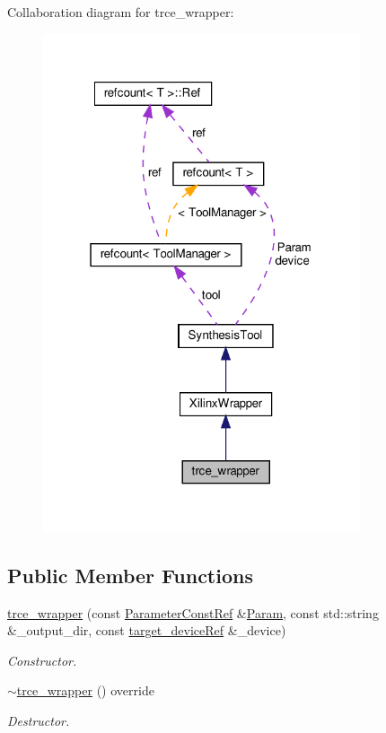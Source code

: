 Collaboration diagram for trce\+\_\+wrapper\+:
\nopagebreak
\begin{figure}[H]
\begin{center}
\leavevmode
\includegraphics[width=265pt]{de/de5/classtrce__wrapper__coll__graph}
\end{center}
\end{figure}
\subsection*{Public Member Functions}
\begin{DoxyCompactItemize}
\item 
\hyperlink{classtrce__wrapper_a5ba24404b3a8f27ab07acc5f6a1691ed}{trce\+\_\+wrapper} (const \hyperlink{Parameter_8hpp_a37841774a6fcb479b597fdf8955eb4ea}{Parameter\+Const\+Ref} \&\hyperlink{classSynthesisTool_a854ef102782ff4d069e1aa6d1a94d64e}{Param}, const std\+::string \&\+\_\+output\+\_\+dir, const \hyperlink{target__device_8hpp_acedb2b7a617e27e6354a8049fee44eda}{target\+\_\+device\+Ref} \&\+\_\+device)
\begin{DoxyCompactList}\small\item\em Constructor. \end{DoxyCompactList}\item 
\hyperlink{classtrce__wrapper_af149e5b47b80b3334262d8fb87046e57}{$\sim$trce\+\_\+wrapper} () override
\begin{DoxyCompactList}\small\item\em Destructor. \end{DoxyCompactList}\end{DoxyCompactItemize}

